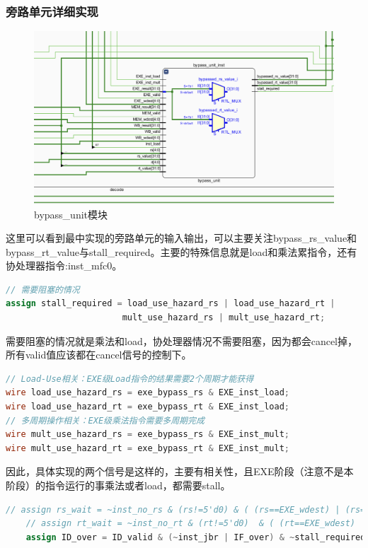 \documentclass[a4paper]{article}
\begin{document}
\subsubsection{旁路单元详细实现}

\begin{figure}[H]
    \centering
    \includegraphics[width=0.8\linewidth]{img/上箱/bypass_unit.jpg}
    \caption{bypass\_unit模块}
\end{figure}

这里可以看到最中实现的旁路单元的输入输出，可以主要关注bypass\_rs\_value和bypass\_rt\_value与stall\_required。主要的特殊信息就是load和乘法累指令，还有协处理器指令:inst\_mfc0。 


\begin{lstlisting}[language=Verilog,caption={阻塞控制信号-产生}]
// 需要阻塞的情况
assign stall_required = load_use_hazard_rs | load_use_hazard_rt | 
                       mult_use_hazard_rs | mult_use_hazard_rt;
\end{lstlisting}

需要阻塞的情况就是乘法和load，协处理器情况不需要阻塞，因为都会cancel掉，所有valid值应该都在cancel信号的控制下。


\begin{lstlisting}[language=Verilog,caption={阻塞控制信号-细节}]
// Load-Use相关：EXE级Load指令的结果需要2个周期才能获得
wire load_use_hazard_rs = exe_bypass_rs & EXE_inst_load;
wire load_use_hazard_rt = exe_bypass_rt & EXE_inst_load;
// 多周期操作相关：EXE级乘法指令需要多周期完成
wire mult_use_hazard_rs = exe_bypass_rs & EXE_inst_mult;
wire mult_use_hazard_rt = exe_bypass_rt & EXE_inst_mult;
\end{lstlisting}

因此，具体实现的两个信号是这样的，主要有相关性，且EXE阶段（注意不是本阶段）的指令运行的事乘法或者load，都需要stall。

\begin{lstlisting}[language=Verilog,caption={阻塞控制信号-效果}]
    // assign rs_wait = ~inst_no_rs & (rs!=5'd0) & ( (rs==EXE_wdest) | (rs==MEM_wdest) | (rs==WB_wdest) );
    // assign rt_wait = ~inst_no_rt & (rt!=5'd0)  & ( (rt==EXE_wdest) | (rt==MEM_wdest) | (rt==WB_wdest) );
    assign ID_over = ID_valid & (~inst_jbr | IF_over) & ~stall_required;
\end{lstlisting}
\end{document}
